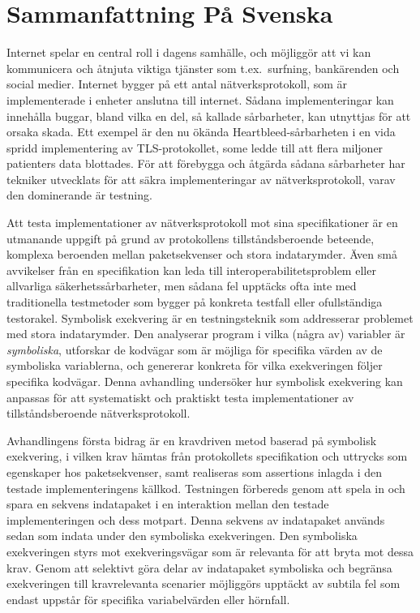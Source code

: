 
\chapter{Sammanfattning På Svenska}\label{chapter:sammanfattning}
Internet spelar en central roll i dagens samhälle, och möjliggör att vi kan kommunicera och åtnjuta viktiga tjänster som t.ex.\ surfning, bankärenden och social medier. Internet bygger på ett antal nätverksprotokoll, som är implementerade i enheter anslutna till internet. Sådana implementeringar kan innehålla buggar, bland vilka en del, så kallade sårbarheter, kan utnyttjas för att orsaka skada. Ett exempel är den nu ökända Heartbleed-sårbarheten i en vida spridd implementering av TLS-protokollet, some ledde till att flera miljoner patienters data blottades. För att förebygga och åtgärda sådana sårbarheter har tekniker utvecklats för att säkra implementeringar av nätverksprotokoll, varav den dominerande är testning.

Att testa implementationer av nätverksprotokoll mot sina specifikationer är en utmanande uppgift på grund av protokollens tillståndsberoende beteende, komplexa beroenden mellan paketsekvenser och stora indatarymder.
Även små avvikelser från en specifikation kan leda till interoperabilitetsproblem eller allvarliga säkerhetssårbarheter, men sådana fel upptäcks ofta inte med traditionella testmetoder som bygger på konkreta testfall eller ofullständiga testorakel.
Symbolisk exekvering är en testningsteknik som addresserar problemet med stora indatarymder. Den analyserar program i vilka (några av) variabler är \emph{symboliska},
utforskar de kodvägar som är möjliga för specifika värden av de symboliska variablerna, och genererar konkreta för vilka exekveringen följer specifika kodvägar.
Denna avhandling undersöker hur symbolisk exekvering kan anpassas för att systematiskt och praktiskt testa implementationer av tillståndsberoende nätverksprotokoll. 

Avhandlingens första bidrag är en kravdriven metod baserad på symbolisk exekvering, i vilken krav hämtas från protokollets specifikation och uttrycks som  egenskaper hos paketsekvenser, samt realiseras som assertions inlagda i den testade implementeringens källkod. Testningen förbereds genom att spela in och spara en sekvens indatapaket i en interaktion mellan den testade implementeringen och dess motpart. Denna sekvens av indatapaket används sedan som indata under den symboliska exekveringen.
Den symboliska exekveringen styrs mot exekveringsvägar som är relevanta för att bryta mot dessa krav. Genom att selektivt göra delar av indatapaket symboliska och begränsa exekveringen till kravrelevanta scenarier möjliggörs upptäckt av subtila fel som endast uppstår för specifika variabelvärden eller hörnfall.

